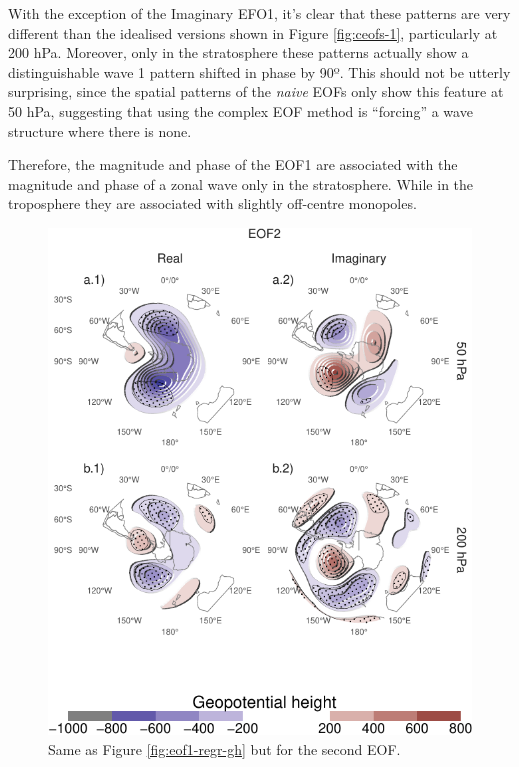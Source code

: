 \documentclass[smallextended]{svjour3}       %
\begin{document}
With the exception of the Imaginary EFO1, it's clear that these patterns are very different than the idealised versions shown in Figure \ref{fig:ceofs-1}, particularly at 200 hPa. Moreover, only in the stratosphere these patterns actually show a distinguishable wave 1 pattern shifted in phase by 90º. This should not be utterly surprising, since the spatial patterns of the \emph{naive} EOFs only show this feature at 50 hPa, suggesting that using the complex EOF method is ``forcing'' a wave structure where there is none.

Therefore, the magnitude and phase of the EOF1 are associated with the magnitude and phase of a zonal wave only in the stratosphere. While in the troposphere they are associated with slightly off-centre monopoles.



\begin{figure}
\centering
\includegraphics{../figures/eof2-regr-gh-1.pdf}
\caption{\label{fig:eof2-regr-gh}Same as Figure \ref{fig:eof1-regr-gh} but for the second EOF.}
\end{figure}
\end{document}
